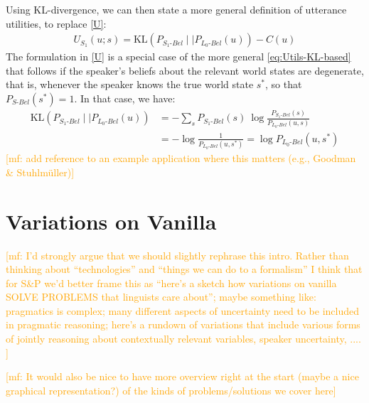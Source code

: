 \documentclass{sp}
\newcommand{\mf}[1]{\textcolor{orange}{[mf: #1]}}
\begin{document}
Using KL-divergence, we can then state a more general definition of utterance utilities, to
replace \eqref{U}:
\begin{align}
  \label{eq:Utils-KL-based}
  U_{S_1}(u; s) = \text{KL}(P_{S_{1}\text{-}Bel} \mid \mid P_{L_{0}\text{-}Bel}(u)) - C(u)
\end{align}
The formulation in \eqref{U} is a special case of the more general \eqref{eq:Utils-KL-based}
that follows if the speaker's beliefs about the relevant world states are degenerate, that is,
whenever the speaker knows the true world state $s^{*}$, so that $P_{S\text{-}Bel}(s^{*})=1$.
In that case, we have:
\begin{align*}
  \text{KL}(P_{S_{1}\text{-}Bel} \mid \mid P_{L_{0}\text{-}Bel}(u)) & = - \sum_{s} P_{S_{1}\text{-}Bel}(s) \ \log \frac{P_{S_{1}\text{-}Bel}(s)}{P_{L_{0}\text{-}Bel}(u,s)} \\
  & =  - \log\frac{1}{P_{L_{0}\text{-}Bel}(u,s^*)} = \log P_{L_{0}\text{-}Bel}(u,s^*)
\end{align*}
\mf{add reference to an example application where this matters (e.g., Goodman \& Stuhlm\"uller)}

\section{Variations on Vanilla} \label{variations}

\mf{I'd strongly argue that we should slightly rephrase this intro. Rather than thinking about ``technologies'' and ``things we can do to a formalism'' I think that for S\&P we'd better frame this as ``here's a sketch how variations on vanilla SOLVE PROBLEMS that linguists care about''; maybe something like: pragmatics is complex; many different aspects of uncertainty need to be included in pragmatic reasoning; here's a rundown of variations that include various forms of jointly reasoning about contextually relevant variables, speaker uncertainty, .... }

\mf{It would also be nice to have more overview right at the start (maybe a nice graphical representation?) of the kinds of problems/solutions we cover here}
\end{document}
